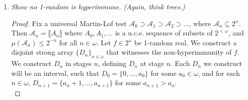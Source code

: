 \documentclass{article}
\begin{document}
\begin{enumerate}
\begin{proof}
      Formally, given $T_e$, define $T_{e+1}\subseteq T_e$ as follows.
      For each $n\in\omega$, define
      \[U_{e,n} :=\{\sigma\in T_e:\;
      \Phi_{e,|\sigma|}^\sigma(n)\uparrow\}.\]
      Then $U_{e,n}$ is computable and closed under initial segments. Let
      $n\in\omega$ be the first integer such that $U_{e,n}$ is infinite.
      Note that $\emptyset''$ can determine if such $n$ exists, and find
      the first one if it does. If no such $n$ exists, set $T_{e+1}=T_e$.
      Otherwise set $T_{e+1}=U_{e,n}$. \\

      Observe that by induction on $e$, each $T_e$ will be computable tree
      since $U_{e,n}$ is computable for each $e,n\in\omega$. Also by
      induction on $e$, each $T_e$ is infinite and computable, therefore by
      Compactness theorem $T:=\cap_{e\in\omega}T_e$ will be infinite. Then
      by Konig's lemma $T$ must contain a path. Fix any path $X$ in $T$. We
      show that $X$ has a hyperimmune-free degree. \\

      Fix an arbitrary $e\in\omega$. We show that $\Phi_e^X$ cannot be the
      characteristic function of a hyperimmune set. Assume it is. Then
      $\Phi_e^X$ is total, so $U_{e,n}$ must be finite for all
      $n\in\omega$. Then $T_{e+1}=T_e$ by construction, which is
      computable.
    \end{proof}

  \item \it Show no 1-random is hyperimmune. (Again, think trees.)
    \begin{proof}
      Fix a universal Martin-Lof test
      $\mathcal{A}_0\supset\mathcal{A}_1\supset\mathcal{A}_2\supset\ldots$,
      where $\mathcal{A}_n\subseteq2^\omega$. Then $\mathcal{A}_n
      =\llbracket A_n\rrbracket$ where $A_0,A_1,\ldots$ is a u.c.e.
      sequence of subsets of $2^{<\omega}$, and
      $\mu(\mathcal{A}_n)\leq2^{-n}$ for all $n\in\omega$. Let
      $f\in2^\omega$ be 1-random real. We construct a disjoint strong array
      $\{D_n\}_{n\in\omega}$ that witnesses the non-hyperimmunity of $f$.
      We construct $D_n$ in stages $n$, defining $D_n$ at stage $n$. Each
      $D_n$ we construct will be an interval, such that
      $D_0=\{0,\ldots,a_0\}$ for some $a_0\in\omega$, and for each
      $n\in\omega$, $D_{n+1}=\{a_n+1,\ldots,a_{n+1}\}$ for some
      $a_{n+1}>a_n$. \\


\end{proof}
\end{enumerate}
\end{document}
